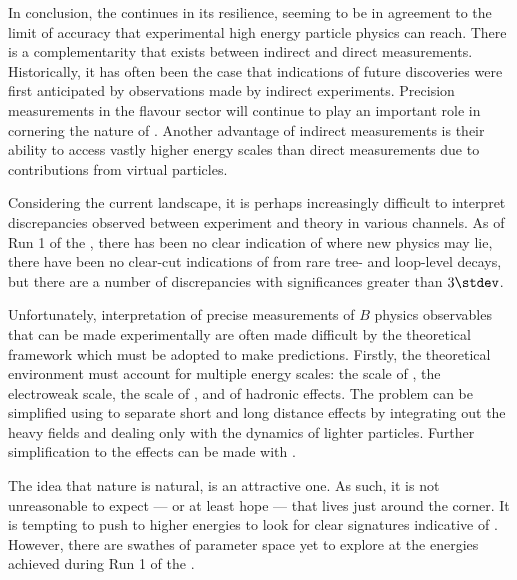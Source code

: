 
In conclusion, the \sm continues in its resilience, seeming to be in agreement to the limit of
accuracy that experimental high energy particle physics can reach.
There is a complementarity that exists between indirect and direct measurements.
Historically, it has often been the case that indications of future discoveries were first
anticipated by observations made by indirect experiments.
Precision measurements in the flavour sector will continue to play an important role in cornering
the nature of \np.
Another advantage of indirect measurements is their ability to access vastly higher energy scales
than direct measurements due to contributions from virtual particles.

Considering the current landscape, it is perhaps increasingly difficult to interpret
discrepancies observed between experiment and theory in various channels.
As of Run 1 of the \lhc, there has been no clear indication of where new physics may lie, there
have been no clear-cut indications of \np from rare tree- and loop-level decays, but there are a
number of discrepancies with significances greater than $3\stdev$.


Unfortunately, interpretation of precise measurements of $B$ physics observables that can be made
experimentally are often made difficult by the theoretical framework which must be adopted to make
predictions.
Firstly, the theoretical environment must account for multiple energy scales: the scale of \np, the
electroweak scale, the scale of \QCD, and of hadronic effects.
The problem can be simplified using \EFT to separate short and long distance effects by integrating
out the heavy fields and dealing only with the dynamics of lighter particles.
Further simplification to the \QCD effects can be made with \HQET.

The idea that nature is natural, is an attractive one.
As such, it is not unreasonable to expect --- or at least hope --- that \np lives just
around the corner.
It is tempting to push to higher energies to look for clear signatures indicative of \np.
However, there are swathes of parameter space yet to explore at the energies achieved during Run 1
of the \lhc.


